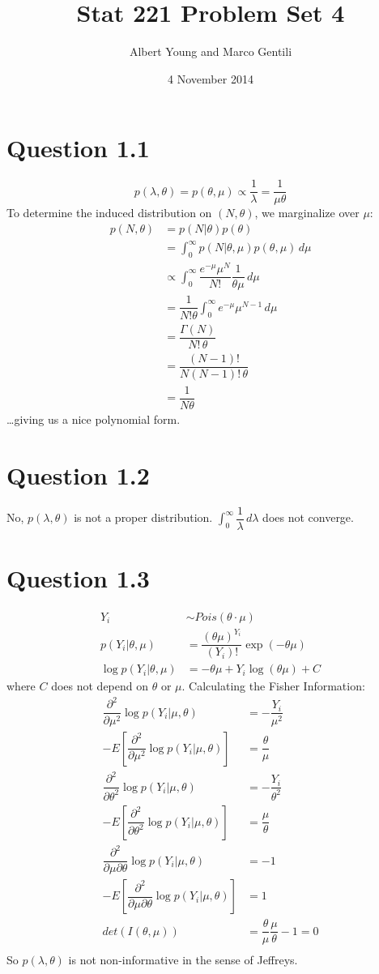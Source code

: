 \documentclass[10pt]{article}
\title{Stat 221 Problem Set 4}
\author{Albert Young and Marco Gentili}
\date{4 November 2014}
\begin{document}
\maketitle

\section{Question 1.1}
\[p(\lambda, \theta) = p(\theta,\mu) \propto \dfrac{1}{\lambda} = \dfrac{1}{\mu\theta}\]
To determine the induced distribution on $(N,\theta)$, we marginalize over $\mu$:
\begin{align*}
p(N, \theta)&=p(N|\theta)p(\theta)\\
&=\int_0^\infty p(N|\theta,\mu)p(\theta,\mu)\,d\mu\\ &\propto\int_0^\infty\dfrac{e^{-\mu}\mu^N}{N!}\dfrac{1}{\theta\mu}\,d\mu\\
&=\dfrac{1}{N!\theta}\int_0^\infty e^{-\mu}\mu^{N-1}\,d\mu\\
&=\dfrac{\Gamma(N)}{N!\,\theta}\\
&=\dfrac{(N-1)!}{N(N-1)!\,\theta}\\
&=\dfrac{1}{N\theta}
\end{align*}
\ldots giving us a nice polynomial form.


\section{Question 1.2}
No, $p(\lambda, \theta)$ is not a proper distribution. $\int_{0}^\infty \dfrac{1}{\lambda}\,d\lambda$ does not converge.

\section{Question 1.3}
\begin{align*}
Y_i &\sim Pois(\theta \cdot \mu)\\
p(Y_i|\theta, \mu) &= \dfrac{(\theta\mu)^{Y_i}}{(Y_i)!}\exp(-\theta\mu)\\
\log p(Y_i|\theta, \mu) &= -\theta\mu + Y_i\log(\theta\mu) + C
\end{align*}
where $C$ does not depend on $\theta$ or $\mu$. Calculating the Fisher Information:
\begin{align*}
\dfrac{\partial^2}{\partial\mu^2}\log p(Y_i|\mu, \theta) &= -\dfrac{Y_i}{\mu^2}\\
-E\left[\dfrac{\partial^2}{\partial\mu^2}\log p(Y_i|\mu, \theta)\right] &= \dfrac{\theta}{\mu}\\
\dfrac{\partial^2}{\partial\theta^2}\log p(Y_i|\mu,\theta) &= -\dfrac{Y_i}{\theta^2}\\
-E\left[\dfrac{\partial^2}{\partial\theta^2}\log p(Y_i|\mu,\theta)\right] &= \dfrac{\mu}{\theta}\\
\dfrac{\partial^2}{\partial \mu \partial \theta}\log p(Y_i|\mu,\theta) &= -1\\
-E\left[\dfrac{\partial^2}{\partial \mu \partial \theta}\log p(Y_i|\mu,\theta)\right] &= 1\\
det(I(\theta,\mu)) &= \dfrac{\theta}{\mu}\dfrac{\mu}{\theta} - 1 = 0\\
\end{align*}
So $p(\lambda, \theta)$ is not non-informative in the sense of Jeffreys.
\end{document}
